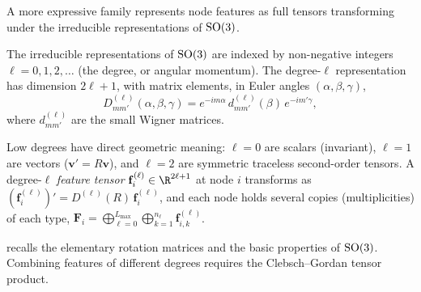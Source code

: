 A more expressive family represents node features as full tensors transforming
under the irreducible representations of $\operatorname{SO}(3)$.

\begin{definition}
\label{def:groups:so3-irreps}
The irreducible representations of $\operatorname{SO}(3)$ are indexed by non-negative integers
$\ell = 0, 1, 2, \dots$ (the degree, or angular momentum). The degree-$\ell$
representation has dimension $2\ell + 1$, with matrix elements, in Euler angles
$(\alpha, \beta, \gamma)$,
\begin{equation}
  D^{(\ell)}_{mm'}(\alpha, \beta, \gamma)
  = e^{-im\alpha}\, d^{(\ell)}_{mm'}(\beta)\, e^{-im'\gamma},
\end{equation}
where $d^{(\ell)}_{mm'}$ are the small Wigner matrices.
\end{definition}

Low degrees have direct geometric meaning: $\ell = 0$ are scalars (invariant),
$\ell = 1$ are vectors ($\mathbf{v}' = R\mathbf{v}$), and $\ell = 2$ are
symmetric traceless second-order tensors. A degree-$\ell$ \emph{feature tensor}
$\mathbf{f}_i^{(\ell)} \in \R^{2\ell+1}$ at node $i$ transforms as
$(\mathbf{f}_i^{(\ell)})' = D^{(\ell)}(R)\, \mathbf{f}_i^{(\ell)}$, and each node
holds several copies (multiplicities) of each type, $\mathbf{F}_i =
\bigoplus_{\ell=0}^{L_{\max}} \bigoplus_{k=1}^{n_\ell}
\mathbf{f}_{i,k}^{(\ell)}$.

 recalls the elementary rotation matrices and the basic
properties of $\operatorname{SO}(3)$. Combining features of different degrees requires the
Clebsch--Gordan tensor product.

